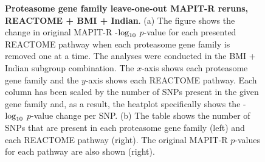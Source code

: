 \documentclass[12pt,a4paper]{article}
\def\log{{\rm log}}
\begin{document}
\begin{figure}[ht]
\caption[TBD]{\textbf{Proteasome gene family leave-one-out MAPIT-R reruns, REACTOME + BMI + Indian}. (a) The figure shows the change in original MAPIT-R -$\log_{10}$ $p$-value for each presented REACTOME pathway when each proteasome gene family is removed one at a time. The analyses were conducted in the BMI + Indian subgroup combination. The $x$-axis shows each proteasome gene family and the $y$-axis shows each REACTOME pathway. Each column has been scaled by the number of SNPs present in the given gene family and, as a result, the heatplot specifically shows the -$\log_{10}$ $p$-value change per SNP. (b) The table shows the number of SNPs that are present in each proteasome gene family (left) and each REACTOME pathway (right). The original MAPIT-R $p$-values for each pathway are also shown (right).}
\label{InterPath-Supp-Figure-Prot-Heatplots-Indian}
\end{figure}
\clearpage
\addtocounter{figure}{-1}
\addtocounter{CharNumber5}{1}
\end{document}

